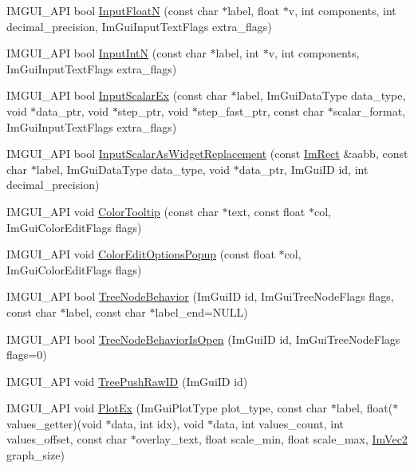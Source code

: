 \begin{DoxyCompactItemize}
\item 
I\+M\+G\+U\+I\+\_\+\+A\+PI bool \hyperlink{namespace_im_gui_a7fe2c74d1c0042b77d8e6788faed0983}{Input\+FloatN} (const char $\ast$label, float $\ast$v, int components, int decimal\+\_\+precision, Im\+Gui\+Input\+Text\+Flags extra\+\_\+flags)
\item 
I\+M\+G\+U\+I\+\_\+\+A\+PI bool \hyperlink{namespace_im_gui_a9b9aaec8d095156b74ee191b532fa137}{Input\+IntN} (const char $\ast$label, int $\ast$v, int components, Im\+Gui\+Input\+Text\+Flags extra\+\_\+flags)
\item 
I\+M\+G\+U\+I\+\_\+\+A\+PI bool \hyperlink{namespace_im_gui_a08c243542b1678859cf0e065f9e43865}{Input\+Scalar\+Ex} (const char $\ast$label, Im\+Gui\+Data\+Type data\+\_\+type, void $\ast$data\+\_\+ptr, void $\ast$step\+\_\+ptr, void $\ast$step\+\_\+fast\+\_\+ptr, const char $\ast$scalar\+\_\+format, Im\+Gui\+Input\+Text\+Flags extra\+\_\+flags)
\item 
I\+M\+G\+U\+I\+\_\+\+A\+PI bool \hyperlink{namespace_im_gui_a9b7223f54687d740a5961d7f278e01ef}{Input\+Scalar\+As\+Widget\+Replacement} (const \hyperlink{struct_im_rect}{Im\+Rect} \&aabb, const char $\ast$label, Im\+Gui\+Data\+Type data\+\_\+type, void $\ast$data\+\_\+ptr, Im\+Gui\+ID id, int decimal\+\_\+precision)
\item 
I\+M\+G\+U\+I\+\_\+\+A\+PI void \hyperlink{namespace_im_gui_afad90b366b6471e3b13175c0ebeb26c8}{Color\+Tooltip} (const char $\ast$text, const float $\ast$col, Im\+Gui\+Color\+Edit\+Flags flags)
\item 
I\+M\+G\+U\+I\+\_\+\+A\+PI void \hyperlink{namespace_im_gui_a6bfb117816d669f8704e5d0c0c0795fe}{Color\+Edit\+Options\+Popup} (const float $\ast$col, Im\+Gui\+Color\+Edit\+Flags flags)
\item 
I\+M\+G\+U\+I\+\_\+\+A\+PI bool \hyperlink{namespace_im_gui_a918eabf70d288e93b2519ee1eac2c0b4}{Tree\+Node\+Behavior} (Im\+Gui\+ID id, Im\+Gui\+Tree\+Node\+Flags flags, const char $\ast$label, const char $\ast$label\+\_\+end=N\+U\+LL)
\item 
I\+M\+G\+U\+I\+\_\+\+A\+PI bool \hyperlink{namespace_im_gui_a22cc50485aad6da8a3a4e156b500ed4a}{Tree\+Node\+Behavior\+Is\+Open} (Im\+Gui\+ID id, Im\+Gui\+Tree\+Node\+Flags flags=0)
\item 
I\+M\+G\+U\+I\+\_\+\+A\+PI void \hyperlink{namespace_im_gui_afddcddce9f2801769e4c79ef769ab600}{Tree\+Push\+Raw\+ID} (Im\+Gui\+ID id)
\item 
I\+M\+G\+U\+I\+\_\+\+A\+PI void \hyperlink{namespace_im_gui_a0a18ae07b294d5667f95a5c003d2efb6}{Plot\+Ex} (Im\+Gui\+Plot\+Type plot\+\_\+type, const char $\ast$label, float($\ast$values\+\_\+getter)(void $\ast$data, int idx), void $\ast$data, int values\+\_\+count, int values\+\_\+offset, const char $\ast$overlay\+\_\+text, float scale\+\_\+min, float scale\+\_\+max, \hyperlink{struct_im_vec2}{Im\+Vec2} graph\+\_\+size)

\end{DoxyCompactItemize}

